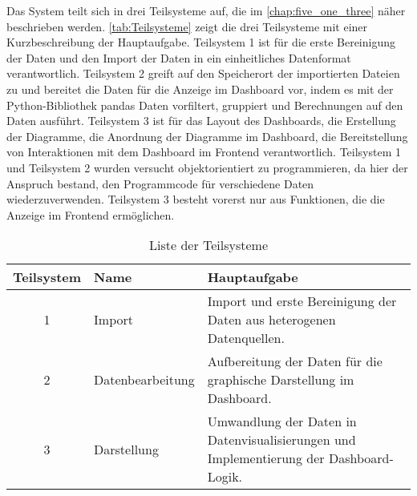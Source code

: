     Das System teilt sich in drei Teilsysteme auf, die im \autoref{chap:five_one_three} näher beschrieben werden. 
    \autoref{tab:Teilsysteme} zeigt die drei Teilsysteme mit einer Kurzbeschreibung der Hauptaufgabe.
    Teilsystem 1 ist für die erste Bereinigung der Daten und den Import der Daten in ein einheitliches Datenformat verantwortlich. 
    Teilsystem 2 greift auf den Speicherort der importierten Dateien zu und bereitet die Daten für die Anzeige im Dashboard vor, 
    indem es mit der Python-Bibliothek pandas Daten vorfiltert, gruppiert und Berechnungen auf den Daten ausführt. Teilsystem 3 ist für das Layout des Dashboards, 
    die Erstellung der Diagramme, die Anordnung der Diagramme im Dashboard, die Bereitstellung von Interaktionen mit dem Dashboard im Frontend
    verantwortlich. Teilsystem 1 und Teilsystem 2 wurden versucht objektorientiert zu programmieren, da hier der Anspruch bestand, den Programmcode
    für verschiedene Daten wiederzuverwenden. Teilsystem 3 besteht vorerst nur aus Funktionen, die die Anzeige im Frontend ermöglichen.

       \begingroup
            \setlength{\tabcolsep}{4pt} %
            \renewcommand{\arraystretch}{1.5}
            \begin{table}[h]
                \centering
                \begin{adjustbox}{max width=\textwidth}
                \Huge
                \begin{tabular}{cll}
                   \toprule
                   \textbf{Teilsystem}             & Name   &{Hauptaufgabe} \\
                   \midrule     
                            1                      &Import  &Import und erste Bereinigung der Daten aus heterogenen Datenquellen.\\
                            2                      &Datenbearbeitung     &Aufbereitung der Daten für die graphische Darstellung im Dashboard.\\
                            3                      &Darstellung          &Umwandlung der Daten in Datenvisualisierungen und Implementierung der Dashboard-Logik.\\

                    \bottomrule
                \end{tabular}
                \end{adjustbox}
                \caption{%
                    Liste der Teilsysteme
                \label{tab:Teilsysteme}
                }
                 \end{table}
            \endgroup
    

